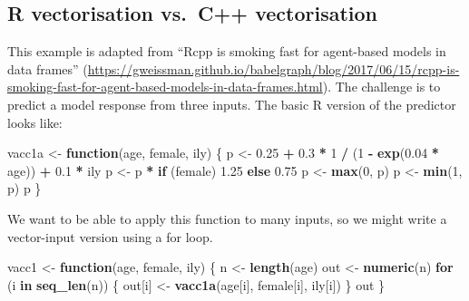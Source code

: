 \documentclass[]{book}
\newenvironment{Shaded}{\begin{snugshade}}{\end{snugshade}}
\newcommand{\ControlFlowTok}[1]{\textcolor[rgb]{0.27,0.27,0.27}{\textbf{#1}}}
\newcommand{\DecValTok}[1]{\textcolor[rgb]{0.06,0.06,0.06}{#1}}
\newcommand{\FloatTok}[1]{\textcolor[rgb]{0.06,0.06,0.06}{#1}}
\newcommand{\KeywordTok}[1]{\textcolor[rgb]{0.27,0.27,0.27}{\textbf{#1}}}
\newcommand{\NormalTok}[1]{#1}
\newcommand{\OperatorTok}[1]{\textcolor[rgb]{0.43,0.43,0.43}{\textbf{#1}}}
\newcommand{\StringTok}[1]{\textcolor[rgb]{0.5,0.5,0.5}{#1}}
\renewcommand{\href}[2]{#2 (\url{#1})}
\begin{document}
\hypertarget{r-vectorisation-vs.c-vectorisation}{%
\subsection{R vectorisation vs.~C++ vectorisation}\label{r-vectorisation-vs.c-vectorisation}}

This example is adapted from \href{https://gweissman.github.io/babelgraph/blog/2017/06/15/rcpp-is-smoking-fast-for-agent-based-models-in-data-frames.html}{``Rcpp is smoking fast for agent-based models in data frames''}. The challenge is to predict a model response from three inputs. The basic R version of the predictor looks like:

\begin{Shaded}
\begin{Highlighting}[]
\NormalTok{vacc1a <-}\StringTok{ }\ControlFlowTok{function}\NormalTok{(age, female, ily) \{}
\NormalTok{  p <-}\StringTok{ }\FloatTok{0.25} \OperatorTok{+}\StringTok{ }\FloatTok{0.3} \OperatorTok{*}\StringTok{ }\DecValTok{1} \OperatorTok{/}\StringTok{ }\NormalTok{(}\DecValTok{1} \OperatorTok{-}\StringTok{ }\KeywordTok{exp}\NormalTok{(}\FloatTok{0.04} \OperatorTok{*}\StringTok{ }\NormalTok{age)) }\OperatorTok{+}\StringTok{ }\FloatTok{0.1} \OperatorTok{*}\StringTok{ }\NormalTok{ily}
\NormalTok{  p <-}\StringTok{ }\NormalTok{p }\OperatorTok{*}\StringTok{ }\ControlFlowTok{if}\NormalTok{ (female) }\FloatTok{1.25} \ControlFlowTok{else} \FloatTok{0.75}
\NormalTok{  p <-}\StringTok{ }\KeywordTok{max}\NormalTok{(}\DecValTok{0}\NormalTok{, p)}
\NormalTok{  p <-}\StringTok{ }\KeywordTok{min}\NormalTok{(}\DecValTok{1}\NormalTok{, p)}
\NormalTok{  p}
\NormalTok{\}}
\end{Highlighting}
\end{Shaded}

We want to be able to apply this function to many inputs, so we might write a vector-input version using a for loop.

\begin{Shaded}
\begin{Highlighting}[]
\NormalTok{vacc1 <-}\StringTok{ }\ControlFlowTok{function}\NormalTok{(age, female, ily) \{}
\NormalTok{  n <-}\StringTok{ }\KeywordTok{length}\NormalTok{(age)}
\NormalTok{  out <-}\StringTok{ }\KeywordTok{numeric}\NormalTok{(n)}
  \ControlFlowTok{for}\NormalTok{ (i }\ControlFlowTok{in} \KeywordTok{seq_len}\NormalTok{(n)) \{}
\NormalTok{    out[i] <-}\StringTok{ }\KeywordTok{vacc1a}\NormalTok{(age[i], female[i], ily[i])}
\NormalTok{  \}}
\NormalTok{  out}
\NormalTok{\}}
\end{Highlighting}
\end{Shaded}
\end{document}

